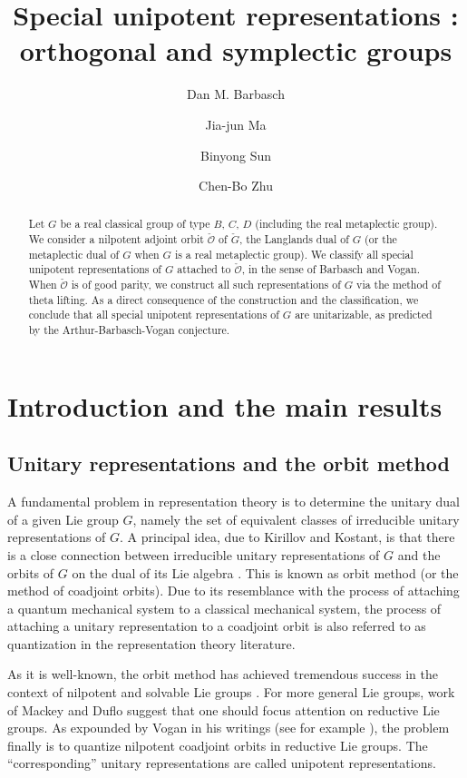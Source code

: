 \documentclass[12pt,a4paper]{amsart}
\title[]{Special unipotent representations : orthogonal and symplectic groups}
\author [D. Barbasch] {Dan M. Barbasch}
\author [J.-J. Ma] {Jia-jun Ma}
\author [B. Sun] {Binyong Sun}
\author [C.-B. Zhu] {Chen-Bo Zhu}
\newcommand{\CO}{{\mathcal {O}}}
\numberwithin{equation}{section}
\theoremstyle{remark}
\begin{document}

\begin{abstract} Let $G$ be a real classical group of type $B$, $C$, $D$ (including the real metaplectic group). We consider a nilpotent adjoint orbit $\check \CO$ of $\check G$, the Langlands dual of $G$ (or the metaplectic dual of $G$ when $G$ is a real metaplectic group). We classify all special unipotent representations of $G$ attached to $\check \CO$, in the sense of Barbasch and Vogan. When $\check \CO$ is of good parity, we construct all such representations of $G$ via the method of theta lifting. As a direct consequence of the construction and the classification, we conclude that all special unipotent representations of $G$ are unitarizable, as predicted by the Arthur-Barbasch-Vogan conjecture.
\end{abstract}



\maketitle


\tableofcontents


\section{Introduction and the main results}\label{sec:intro}


\subsection{Unitary representations and the orbit method}
A fundamental problem in representation theory is to determine the unitary dual
of a given Lie group $G$, namely the set of equivalent classes of irreducible
unitary representations of $G$. A principal idea, due to Kirillov and Kostant,
is that there is a close connection between irreducible unitary representations
of $G$ and the orbits of $G$ on the dual of its Lie algebra \cite{Ki62,Ko70}.
This is known as orbit method (or the method of coadjoint orbits). Due to its
resemblance with the process of attaching a quantum mechanical system to a
classical mechanical system, the process of attaching a unitary representation
to a coadjoint orbit is also referred to as quantization in the representation
theory literature.

As it is well-known, the orbit method has achieved tremendous success in the
context of nilpotent and solvable Lie groups \cite{Ki62,AK}. For more general
Lie groups, work of Mackey and Duflo \cite{Ma,Du82} suggest that one should
focus attention on reductive Lie groups. As expounded by Vogan in his writings
(see for example \cite{VoBook,Vo98,Vo00}), the problem finally is to quantize
nilpotent coadjoint orbits in reductive Lie groups. The ``corresponding''
unitary representations are called unipotent representations.
\end{document}
